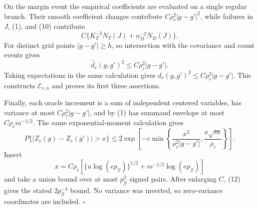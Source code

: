 On the margin event the empirical coefficients are evaluated on a single
regular branch.  Their smooth coefficient changes contribute
\(C\rho_r^2|g-g'|^2\), while failures in \(J\), (1), and (10) contribute
\[
 C\{K_T^{-2}N_T(J)+n_D^{-2}N_D(J)\}.
\]
For distinct grid points \(|g-g'|\ge h\), so intersection with the covariance
and count events gives
\[
 \widehat d_r(g,g')^2\le C\rho_r^2|g-g'|.               \tag{11}
\]
Taking expectations in the same calculation gives
\(d_r(g,g')^2\le C\rho_r^2|g-g'|\).  This constructs
\(\mathcal E_{r,n}\) and proves its first three assertions.

Finally, each oracle increment is a sum of independent centered variables,
has variance at most \(C\rho_r^2|g-g'|\), and by (1) has summand envelope at
most \(C\rho_rm^{-1/2}\).  The same exponential-moment calculation gives
\[
 P\{|Z_r(g)-Z_r(g')|>x\}
 \le2\exp\left[-c\min\left\{
 \frac{x^2}{\rho_r^2|g-g'|},
 \frac{x\sqrt m}{\rho_r}\right\}\right].              \tag{12}
\]
Insert
\[
 x=C\rho_r\left[\{u\log(ep_{\mathcal G})\}^{1/2}
 +m^{-1/2}\log(ep_{\mathcal G})\right]
\]
and take a union bound over at most \(p_{\mathcal G}^2\) signed pairs.  After
enlarging \(C\), (12) gives the stated \(2p_{\mathcal G}^{-4}\) bound.  No
variance was inverted, so zero-variance coordinates are included. \(\square\)
